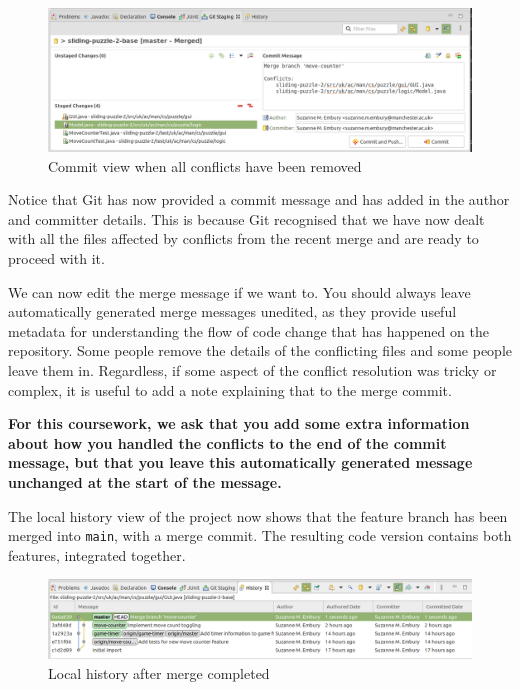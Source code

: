 \documentclass[
]{book}
\begin{document}
\begin{figure}

{\centering \includegraphics[width=1\linewidth]{images/commitViewWhenAllConflictsRemoved} 

}

\caption{Commit view when all conflicts have been removed}\label{fig:commitViewWhenAllConflictsRemoved-fig}
\end{figure}

Notice that Git has now provided a commit message and has added in the author and committer details. This is because Git recognised that we have now dealt with all the files affected by conflicts from the recent merge and are ready to proceed with it.

We can now edit the merge message if we want to. You should always leave automatically generated merge messages unedited, as they provide useful metadata for understanding the flow of code change that has happened on the repository. Some people remove the details of the conflicting files and some people leave them in. Regardless, if some aspect of the conflict resolution was tricky or complex, it is useful to add a note explaining that to the merge commit.

\textbf{For this coursework, we ask that you add some extra information about how you handled the conflicts to the end of the commit message, but that you leave this automatically generated message unchanged at the start of the message.}

The local history view of the project now shows that the feature branch has been merged into \texttt{main}, with a merge commit. The resulting code version contains both features, integrated together.

\begin{figure}

{\centering \includegraphics[width=1\linewidth]{images/localHistoryAfterMergeCompleted} 

}

\caption{Local history after merge completed}\label{fig:localHistoryAfterMergeCompleted-fig}
\end{figure}
\end{document}
